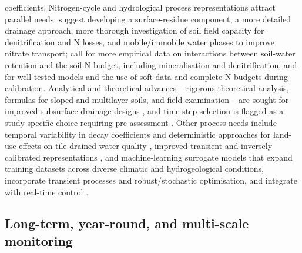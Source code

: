 coefficients. Nitrogen-cycle and hydrological process representations attract
parallel needs: \textcite{Malone2017} suggest developing a surface-residue
component, a more detailed drainage approach, more thorough investigation of soil
field capacity for denitrification and N losses, and mobile/immobile water phases
to improve nitrate transport; \textcite{Gillette2018} call for more empirical data
on interactions between soil-water retention and the soil-N budget, including
mineralisation and denitrification, and for well-tested models and the use of
soft data and complete N budgets during calibration. Analytical and theoretical
advances -- rigorous theoretical analysis, formulas for sloped and multilayer
soils, and field examination -- are sought for improved subsurface-drainage designs
\parencite{Tao2016,Tao2019}, and time-step selection is flagged as a
study-specific choice requiring pre-assessment \parencite{Awad2022b}. Other
process needs include temporal variability in decay coefficients and deterministic
approaches for land-use effects on tile-drained water quality \parencite{Rudra2005},
improved transient and inversely calibrated representations \parencite{Sedaghatdoost2018},
and machine-learning surrogate models that expand training datasets across diverse
climatic and hydrogeological conditions, incorporate transient processes and
robust/stochastic optimisation, and integrate with real-time control
\parencite{Lei2026}.

\subsection{Long-term, year-round, and multi-scale monitoring}


